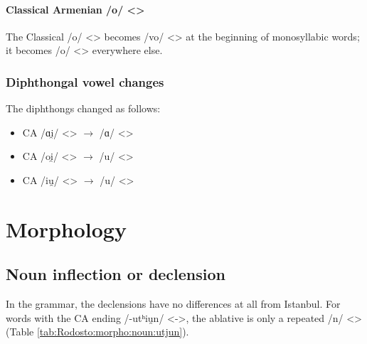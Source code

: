 \paragraph{Classical Armenian /o/ <>} 

The Classical /o/ <> becomes /vo/ <> at the beginning of monosyllabic words; it becomes /o/ <> everywhere else.


\subsubsection{Diphthongal vowel changes} 

The diphthongs changed as follows:\begin{itemize}
	\item CA /ɑi̯/ <> $\rightarrow$ /ɑ/ <> 
	\item CA /oi̯/ <> $\rightarrow$ /u/ <> 
	\item CA /iu̯/ <> $\rightarrow$ /u/ <> 
\end{itemize}

\section{Morphology}
\subsection{Noun inflection or declension}


In the grammar, the declensions have no differences at all from Istanbul. For words with the CA ending /-utʰiu̯n/ <->, the ablative is only a repeated /n/ <> (Table \ref{tab:Rodosto:morpho:noun:utjun}). 




\begin{table}[H]
	\centering 
	\caption{Ablative marking of nominalizer suffix from Classical /-utʰiu̯n/ in the Rodosto dialect}
	\label{tab:Rodosto:morpho:noun:utjun}
	
\end{table}

